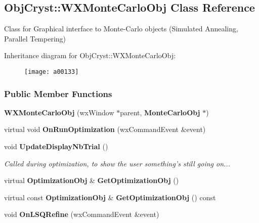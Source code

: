 \subsection{\-Obj\-Cryst\-:\-:\-W\-X\-Monte\-Carlo\-Obj \-Class \-Reference}
\label{a00133}


\-Class for \-Graphical interface to \-Monte-\/\-Carlo objects (\-Simulated \-Annealing, \-Parallel \-Tempering)  


\-Inheritance diagram for \-Obj\-Cryst\-:\-:\-W\-X\-Monte\-Carlo\-Obj\-:\begin{figure}[H]
\begin{center}
\leavevmode
\texttt{[image: a00133]}
\end{center}
\end{figure}
\subsubsection*{\-Public \-Member \-Functions}
\begin{DoxyCompactItemize}
\item 
{\bfseries \-W\-X\-Monte\-Carlo\-Obj} (wx\-Window $\ast$parent, {\bf \-Monte\-Carlo\-Obj} $\ast$)\label{a00133_a7f065d157d74531110e16c7d8081a95c}

\item 
virtual void {\bfseries \-On\-Run\-Optimization} (wx\-Command\-Event \&event)\label{a00133_a098a0d500afd4106725f308b4a5938a5}

\item 
void {\bf \-Update\-Display\-Nb\-Trial} ()\label{a00133_acbceaa3d0ad0a5936d79a4322eca4df3}

\begin{DoxyCompactList}\small\item\em \-Called during optimization, to show the user something's still going on... \end{DoxyCompactList}\item 
virtual {\bf \-Optimization\-Obj} \& {\bfseries \-Get\-Optimization\-Obj} ()\label{a00133_a82f53dc7990c736211df87a47c0104eb}

\item 
virtual const {\bf \-Optimization\-Obj} \& {\bfseries \-Get\-Optimization\-Obj} () const \label{a00133_a9d58c53f79b831360d3dc09eb8da5213}

\item 
void {\bfseries \-On\-L\-S\-Q\-Refine} (wx\-Command\-Event \&event)\label{a00133_aa7c362490aa3761ae1426f2fe111d622}

\end{DoxyCompactItemize}

